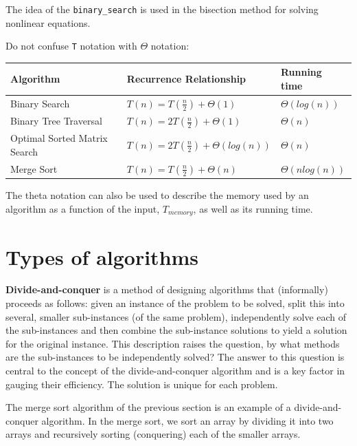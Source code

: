 \documentclass[justified, sixbynine]{tufte-book}
\def\ft{\small\tt}
\theoremstyle{plain}%
\newtheorem * {corollary}{Corollary}
\theoremstyle{definition}
\theoremstyle{remark}
\newtheorem * {remark}{Remark}
\newtheorem * {note}{Note}
\begin{document}
\begin{fullwidth}
The idea of the {\ft binary\_search} is used in the bisection method for solving nonlinear equations.

Do not confuse {\ft T} notation with $\Theta$ notation:

\begin{table}
\begin{tabular}{|l|l|l|}\hline
Algorithm & Recurrence Relationship & Running time \\ \hline
Binary Search & $T(n) = T(\frac n 2) + \Theta (1)$ & $\Theta(log(n))$ \\ \hline
Binary Tree Traversal & $T(n) = 2T(\frac n 2) + \Theta (1)$ & $\Theta(n)$ \\ \hline
Optimal Sorted Matrix Search & $T(n) = 2T(\frac n 2) + \Theta (log(n))$ & $\Theta(n)$ \\ \hline
Merge Sort & $T(n) = T(\frac n 2) + \Theta (n)$ & $\Theta(n log(n))$ \\ \hline
\end{tabular}
\label{table1}
\end{table}

The theta notation can also be used to describe the memory used by an algorithm as a function of the input, $T_{memory}$, as well as its running time.

\goodbreak\section{Types of algorithms}


{\bf Divide-and-conquer}
 is a method of designing algorithms that
(informally) proceeds as follows: given an instance of the problem to be
solved, split this into several, smaller sub-instances (of the same
problem), independently solve each of the sub-instances and then combine the
sub-instance solutions to yield a solution for the original instance.
This description raises the question, by what methods are the sub-instances
to be independently solved? The answer to this question is central to the
concept of the divide-and-conquer algorithm and is a key factor in gauging
their efficiency. The solution is unique for each problem.

The merge sort algorithm of the previous section is an example of a divide-and-conquer algorithm. In the merge sort, we sort an array by dividing it into two arrays and recursively sorting (conquering) each of the smaller arrays.


\end{fullwidth}
\end{document}

